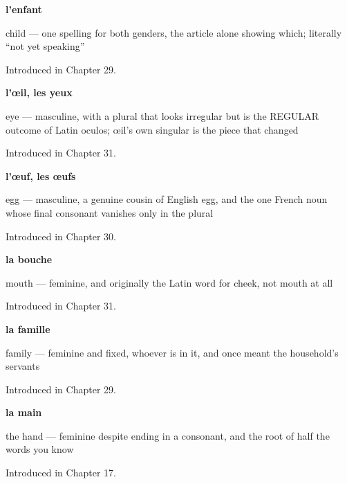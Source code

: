 \noindent\begin{minipage}[t]{\linewidth}
\raggedright
\textbf{l'enfant}\par
\small child — one spelling for both genders, the article alone showing which; literally \textquotedblleft{}not yet speaking\textquotedblright{}\par
\footnotesize Introduced in Chapter 29.
\end{minipage}\par\medskip

\noindent\begin{minipage}[t]{\linewidth}
\raggedright
\textbf{l'œil, les yeux}\par
\small eye — masculine, with a plural that looks irregular but is the REGULAR outcome of Latin oculos; œil's own singular is the piece that changed\par
\footnotesize Introduced in Chapter 31.
\end{minipage}\par\medskip

\noindent\begin{minipage}[t]{\linewidth}
\raggedright
\textbf{l'œuf, les œufs}\par
\small egg — masculine, a genuine cousin of English egg, and the one French noun whose final consonant vanishes only in the plural\par
\footnotesize Introduced in Chapter 30.
\end{minipage}\par\medskip

\noindent\begin{minipage}[t]{\linewidth}
\raggedright
\textbf{la bouche}\par
\small mouth — feminine, and originally the Latin word for cheek, not mouth at all\par
\footnotesize Introduced in Chapter 31.
\end{minipage}\par\medskip

\noindent\begin{minipage}[t]{\linewidth}
\raggedright
\textbf{la famille}\par
\small family — feminine and fixed, whoever is in it, and once meant the household's servants\par
\footnotesize Introduced in Chapter 29.
\end{minipage}\par\medskip

\noindent\begin{minipage}[t]{\linewidth}
\raggedright
\textbf{la main}\par
\small the hand — feminine despite ending in a consonant, and the root of half the words you know\par
\footnotesize Introduced in Chapter 17.
\end{minipage}\par\medskip

